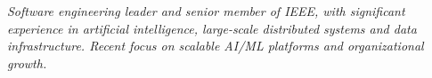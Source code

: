 {\selectfont
	\begin{justify}\textit{Software engineering leader and senior member of IEEE, with significant experience in artificial intelligence, large-scale distributed systems and data infrastructure. Recent focus on scalable AI/ML platforms and organizational growth.}\end{justify}
}